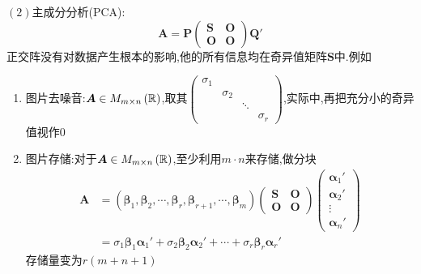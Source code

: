 $(2)$主成分分析(PCA):\[
    \bm{A}=\bm{P}\begin{pmatrix}
        \bm{S} & \bm{O} \\
        \bm{O} & \bm{O}
    \end{pmatrix}\bm{Q}'
\]正交阵没有对数据产生根本的影响,他的所有信息均在奇异值矩阵$\bm{S}$中.例如\begin{enumerate}[label=\arabic*)]
    \item 图片去噪音:$\bm{A}\in M_{m\times n}\left(\mathbb{R} \right)$,取其$\begin{pmatrix}
                  \sigma_1 &          &        &          \\
                           & \sigma_2 &        &          \\
                           &          & \ddots &          \\
                           &          &        & \sigma_r
              \end{pmatrix}$,实际中,再把充分小的奇异值视作$0$
    \item 图片存储:对于$\bm{A}\in M_{m\times n}\left(\mathbb{R} \right)$,至少利用$m\cdot n$来存储,做分块\begin{align*}
              \bm{A} & =\left(
              \bm{\beta}_1,\bm{\beta}_2,\cdots,\bm{\beta}_r,\bm{\beta}_{r+1},\cdots,\bm{\beta}_m
              \right)\begin{pmatrix}
                         \bm{S} & \bm{O} \\
                         \bm{O} & \bm{O}
                     \end{pmatrix}\begin{pmatrix}
                                      \bm{\alpha}_1' \\\bm{\alpha}_2'\\\vdots\\\bm{\alpha}_n'
                                  \end{pmatrix}                                                \\
                     & =\sigma_1\bm{\beta}_1\bm{\alpha}_1'+\sigma_2\bm{\beta}_2\bm{\alpha}_2'+\cdots+\sigma_r\bm{\beta}_r\bm{\alpha}_r'
          \end{align*}存储量变为$r\left(
              m+n+1
              \right)$
\end{enumerate}


